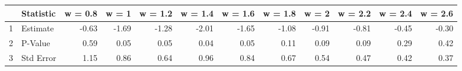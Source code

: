 \begin{tabular}{rlrrrrrrrrrr}
  \hline
 & Statistic & w = 0.8 & w = 1 & w = 1.2 & w = 1.4 & w = 1.6 & w = 1.8 & w = 2 & w = 2.2 & w = 2.4 & w = 2.6 \\ 
  \hline
1 & Estimate & -0.63 & -1.69 & -1.28 & -2.01 & -1.65 & -1.08 & -0.91 & -0.81 & -0.45 & -0.30 \\ 
  2 & P-Value & 0.59 & 0.05 & 0.05 & 0.04 & 0.05 & 0.11 & 0.09 & 0.09 & 0.29 & 0.42 \\ 
  3 & Std Error & 1.15 & 0.86 & 0.64 & 0.96 & 0.84 & 0.67 & 0.54 & 0.47 & 0.42 & 0.37 \\ 
   \hline
\end{tabular}
